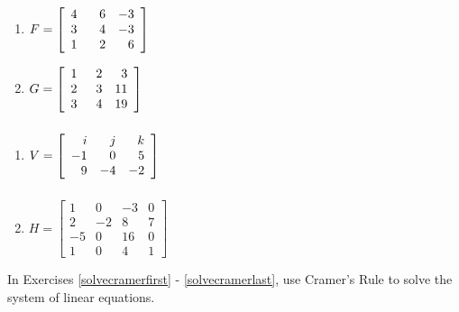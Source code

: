 \documentclass{ximera}
\begin{document}
\begin{multicols}{2}
\begin{enumerate}
\setcounter{enumi}{\value{HW}}

\item $F = \left[ \begin{array}{rrr} 4 & \hphantom{-}6 & -3 \\ 3 & 4 & -3 \\ 1 & 2 & 6 \end{array} \right]$
\item $G = \left[ \begin{array}{rrr} 1 & \hphantom{1}2 & 3 \\ 2 & 3 & 11 \\ 3 & 4 & 19 \end{array} \right]$ \label{matrixG}

\setcounter{HW}{\value{enumi}}
\end{enumerate}
\end{multicols}

\begin{multicols}{2}
\begin{enumerate}
\setcounter{enumi}{\value{HW}}

\item $V = \left[ \begin{array}{rrr} i & j & k \\ -1 & 0 & 5 \\ 9 & -4 & -2 \end{array} \right] \vphantom{\left[ \begin{array}{rrrr} 1 & 0 & -3 & 0 \\ 2 & -2 & 8 & 7 \\ -5 & 0 & 16 & 0 \\ 1 & 0 & 4 & 1 \end{array} \right]}$
\item $H = \left[ \begin{array}{rrrr} 1 & 0 & -3 & 0 \\ 2 & -2 & 8 & 7 \\ -5 & 0 & 16 & 0 \\ 1 & 0 & 4 & 1 \end{array} \right]$ \label{finddetlast}


\setcounter{HW}{\value{enumi}}
\end{enumerate}
\end{multicols}


In Exercises \ref{solvecramerfirst} - \ref{solvecramerlast},   use Cramer's Rule to solve the system of linear equations.
\end{document}
